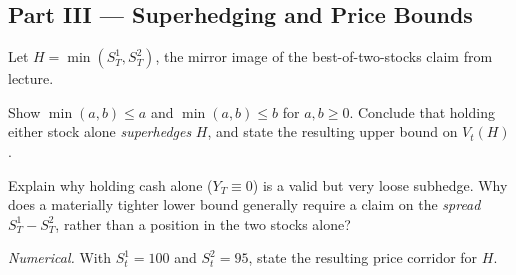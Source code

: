 \subsection*{Part III --- Superhedging and Price Bounds}

\begin{exercise}
Let \(H=\min(S_T^1,S_T^2)\), the mirror image of the best-of-two-stocks claim
from lecture.
\begin{exparts}
  \item Show \(\min(a,b)\leq a\) and \(\min(a,b)\leq b\) for \(a,b\geq0\).
  Conclude that holding either stock alone \emph{superhedges} \(H\), and
  state the resulting upper bound on \(V_t(H)\).
  \item Explain why holding cash alone (\(Y_T\equiv0\)) is a valid but very
  loose subhedge. Why does a materially tighter lower bound generally
  require a claim on the \emph{spread} \(S_T^1-S_T^2\), rather than a
  position in the two stocks alone?
  \item \emph{Numerical.} With \(S_t^1=100\) and \(S_t^2=95\), state the
  resulting price corridor for \(H\).
\end{exparts}
\end{exercise}

